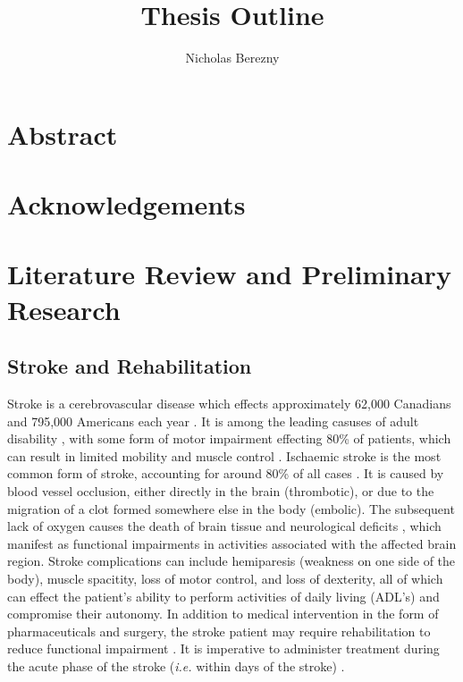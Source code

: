 \documentclass[12pt]{report}
\author{Nicholas Berezny}
\title{Thesis Outline}
\begin{document}
\maketitle
\newpage

\chapter*{Abstract}
\chapter*{Acknowledgements}

\tableofcontents
\listoffigures
\listoftables

\chapter{Literature Review and Preliminary Research}


\section{Stroke and Rehabilitation}

Stroke is a cerebrovascular disease which effects approximately 62,000 Canadians and 795,000 Americans each year \cite{Benjamin2018,Hebert2016}. It is among the leading casuses of adult disability \cite{Ewart2003}, with some form of motor impairment effecting 80\% of patients, which can result in limited mobility and muscle control \cite{Langhorne2009}. Ischaemic stroke is the most common form of stroke, accounting for around 80\% of all cases \cite{Rey2008}. It is caused by blood vessel occlusion, either directly in the brain (thrombotic), or due to the migration of a clot formed somewhere else in the body (embolic). The subsequent lack of oxygen causes the death of brain tissue and neurological deficits \cite{Prabhakaran2015}, which manifest as functional impairments in activities associated with the affected brain region. Stroke complications can include hemiparesis (weakness on one side of the body), muscle spacitity, loss of motor control, and loss of dexterity, all of which can effect the patient's ability to perform activities of daily living (ADL's) and compromise their autonomy. In addition to medical intervention in the form of pharmaceuticals and surgery, the stroke patient may require rehabilitation to reduce functional impairment \cite{Stroke}. It is imperative to administer treatment during the acute phase of the stroke (\textit{i.e.} within days of the stroke) \cite{Prabhakaran2015}.
\end{document}
